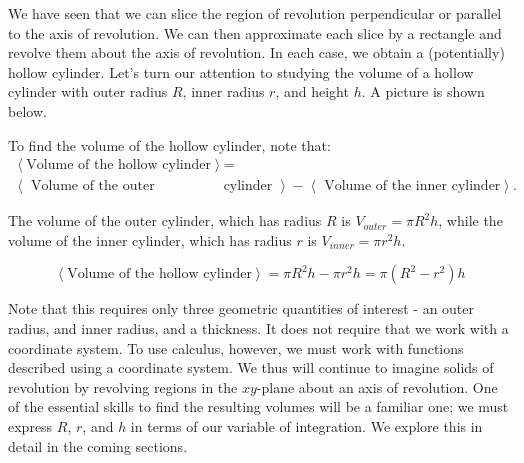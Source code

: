 \documentclass{ximera}
\begin{document}
We have seen that we can slice the region of revolution perpendicular or parallel to the axis of revolution.  We can then approximate each slice by a rectangle and revolve them about the axis of revolution.  In each case, we obtain a (potentially) hollow cylinder. Let's turn our attention to studying the volume of a hollow cylinder with outer radius $R$, inner radius $r$, and height $h$.  A picture is shown below.

\begin{image} %
\end{image}

To find the volume of the hollow cylinder, note that:
\begin{align*}
\left< \textrm{Volume of the hollow cylinder} \right>  &=   \\
 \left< \textrm{ Volume of the outer} \right. & \left. \textrm{cylinder } \right> - \left< \textrm{ Volume of the inner cylinder} \right>.
\end{align*}
 
 The volume of the outer cylinder, which has radius $R$ is $V_{outer} = \pi R^2 h$, while the volume of the inner cylinder, which has radius $r$ is $V_{inner} = \pi r^2 h$.  
 
\[
\left< \textrm{Volume of the hollow cylinder} \right> = \pi R^2h-\pi r^2h=\pi(R^2-r^2)h 
\]

Note that this requires only three geometric quantities of interest - an outer radius, and inner radius, and a thickness.  It does not require that we work with a coordinate system.  To use calculus, however, we must work with functions described using a coordinate system.  We thus will continue to imagine solids of revolution by revolving regions in the $xy$-plane about an axis of revolution.  One of the essential skills to find the resulting volumes will be a familiar one; we must express $R$, $r$, and $h$ in terms of our variable of integration.  We explore this in detail in the coming sections.
\end{document}
